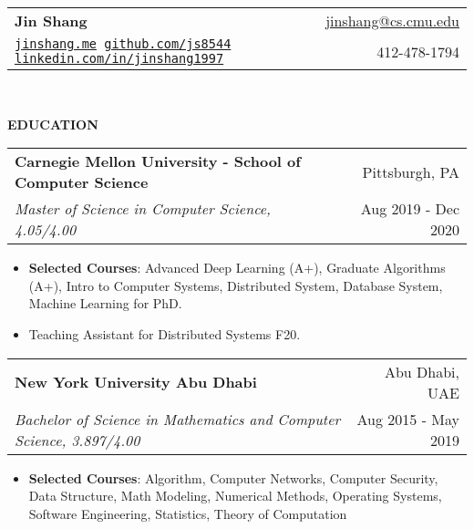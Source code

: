 \documentclass[letterpaper,11pt]{article}
\makeatletter
\newcommand{\resitem}[1]{\item  #1}
\newcommand{\resheading}[1]{{\large \colorbox{mygrey}{\begin{minipage}{\linewidth}{\textbf{#1 \vphantom{p\^{E}}}}\end{minipage}}}}
\newcommand{\ressubheading}[4]{
\begin{tabular*}{1.04\linewidth}{l@{\extracolsep{\fill}}r}
		\textbf{#1} & #2 \\
		\textit{#3} & #4 \\
\end{tabular*}\vspace{-6pt}}
\makeatother
\begin{document}
\newcommand{\mywebheader}{
\begin{tabular*}{7in}{l@{\extracolsep{\fill}}r}
	\textbf{{\LARGE Jin Shang}} & \href{mailto:jinshang@cs.cmu.edu}{jinshang@cs.cmu.edu}\\
	{\footnotesize \texttt{\href{https://jinshang.me}{jinshang.me} \hspace{1em} \href{https://github.com/js8544}{github.com/js8544} \hspace{1em} \href{https://linkedin.com/in/jinshang1997}{linkedin.com/in/jinshang1997}}}& 412-478-1794 \\
	\end{tabular*}
\\
\vspace{0.1in}}

\mywebheader

\resheading{EDUCATION}
	\begin{description}
		\item
			\ressubheading{Carnegie Mellon University - School of Computer Science}{Pittsburgh, PA}{Master of Science in Computer Science, 4.05/4.00} {Aug 2019 - Dec 2020}
			{ \footnotesize
				\begin{itemize}
					\resitem{\textbf{Selected Courses}: Advanced Deep Learning (A+), Graduate Algorithms (A+), Intro to Computer Systems, Distributed System, Database System, Machine Learning for PhD.}
					\resitem{Teaching Assistant for Distributed Systems F20.}
				\end{itemize}
				}
		\item
			\ressubheading{New York University Abu Dhabi}{Abu Dhabi, UAE}{Bachelor of Science in Mathematics and Computer Science, 3.897/4.00} {Aug 2015 - May 2019}
				{ \footnotesize
				\begin{itemize}
					\resitem{\textbf{Selected Courses}: Algorithm, Computer Networks, Computer Security, Data Structure, Math Modeling, Numerical Methods, Operating Systems, Software Engineering, Statistics, Theory of Computation}
				\end{itemize}
				}
\begin{comment}
\end{comment}
	\end{description} %
\end{document}
